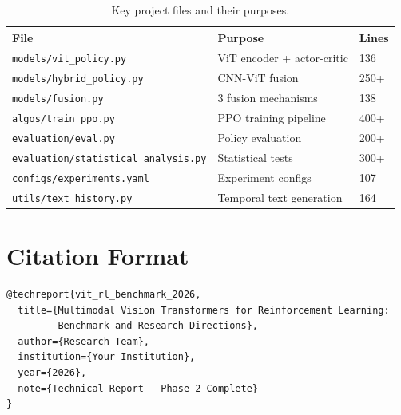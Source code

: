 \documentclass[12pt,a4paper,openany]{report}
\begin{document}
\begin{table}[H]
\centering
\small
\begin{tabular}{lll}
\toprule
File & Purpose & Lines \\
\midrule
\texttt{models/vit\_policy.py} & ViT encoder + actor-critic & 136 \\
\texttt{models/hybrid\_policy.py} & CNN-ViT fusion & 250+ \\
\texttt{models/fusion.py} & 3 fusion mechanisms & 138 \\
\texttt{algos/train\_ppo.py} & PPO training pipeline & 400+ \\
\texttt{evaluation/eval.py} & Policy evaluation & 200+ \\
\texttt{evaluation/statistical\_analysis.py} & Statistical tests & 300+ \\
\texttt{configs/experiments.yaml} & Experiment configs & 107 \\
\texttt{utils/text\_history.py} & Temporal text generation & 164 \\
\bottomrule
\end{tabular}
\caption{Key project files and their purposes.}
\end{table}

\chapter{Citation Format}

\begin{verbatim}
@techreport{vit_rl_benchmark_2026,
  title={Multimodal Vision Transformers for Reinforcement Learning:
         Benchmark and Research Directions},
  author={Research Team},
  institution={Your Institution},
  year={2026},
  note={Technical Report - Phase 2 Complete}
}
\end{verbatim}

\end{document}
